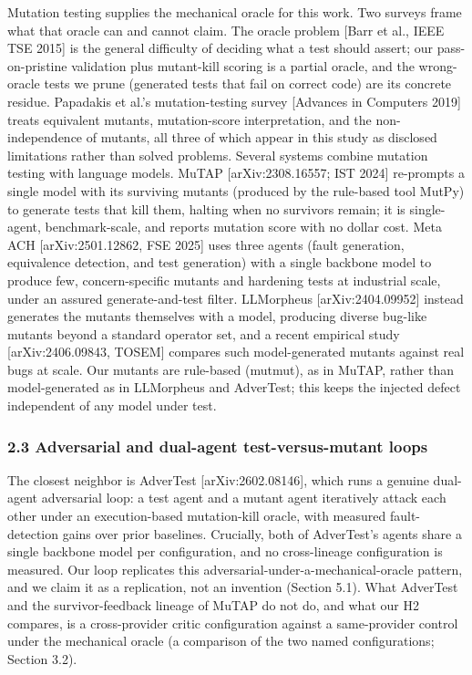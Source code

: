 \documentclass[
  11pt,
]{article}
\begin{document}
Mutation testing supplies the mechanical oracle for this work. Two
surveys frame what that oracle can and cannot claim. The oracle problem
{[}Barr et al., IEEE TSE 2015{]} is the general difficulty of deciding
what a test should assert; our pass-on-pristine validation plus
mutant-kill scoring is a partial oracle, and the wrong-oracle tests we
prune (generated tests that fail on correct code) are its concrete
residue. Papadakis et al.'s mutation-testing survey {[}Advances in
Computers 2019{]} treats equivalent mutants, mutation-score
interpretation, and the non-independence of mutants, all three of which
appear in this study as disclosed limitations rather than solved
problems. Several systems combine mutation testing with language models.
MuTAP {[}arXiv:2308.16557; IST 2024{]} re-prompts a single model with
its surviving mutants (produced by the rule-based tool MutPy) to
generate tests that kill them, halting when no survivors remain; it is
single-agent, benchmark-scale, and reports mutation score with no dollar
cost. Meta ACH {[}arXiv:2501.12862, FSE 2025{]} uses three agents (fault
generation, equivalence detection, and test generation) with a single
backbone model to produce few, concern-specific mutants and hardening
tests at industrial scale, under an assured generate-and-test filter.
LLMorpheus {[}arXiv:2404.09952{]} instead generates the mutants
themselves with a model, producing diverse bug-like mutants beyond a
standard operator set, and a recent empirical study {[}arXiv:2406.09843,
TOSEM{]} compares such model-generated mutants against real bugs at
scale. Our mutants are rule-based (mutmut), as in MuTAP, rather than
model-generated as in LLMorpheus and AdverTest; this keeps the injected
defect independent of any model under test.

\subsubsection{2.3 Adversarial and dual-agent test-versus-mutant
loops}\label{adversarial-and-dual-agent-test-versus-mutant-loops}

The closest neighbor is AdverTest {[}arXiv:2602.08146{]}, which runs a
genuine dual-agent adversarial loop: a test agent and a mutant agent
iteratively attack each other under an execution-based mutation-kill
oracle, with measured fault-detection gains over prior baselines.
Crucially, both of AdverTest's agents share a single backbone model per
configuration, and no cross-lineage configuration is measured. Our loop
replicates this adversarial-under-a-mechanical-oracle pattern, and we
claim it as a replication, not an invention (Section 5.1). What
AdverTest and the survivor-feedback lineage of MuTAP do not do, and what
our H2 compares, is a cross-provider critic configuration against a
same-provider control under the mechanical oracle (a comparison of the
two named configurations; Section 3.2).
\end{document}
